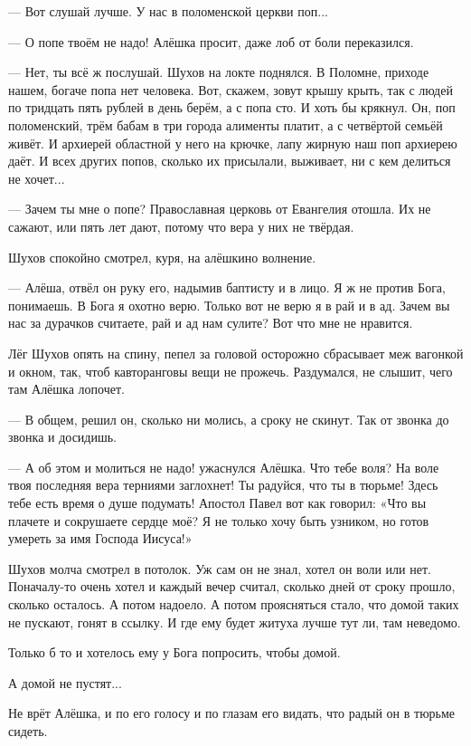 --- Вот слушай лучше. У нас в поломенской церкви поп...

--- О попе твоём \dash не надо! \dash Алёшка просит, даже лоб от боли переказился.

--- Нет, ты всё ж послушай. \dash Шухов на локте поднялся. \Dash В Поломне, приходе нашем, богаче попа
нет человека. Вот, скажем, зовут крышу крыть, так с людей по тридцать пять рублей в день берём,
а с попа \dash сто. И хоть бы крякнул. Он, поп поломенский, трём бабам в три города алименты
платит, а с четвёртой семьёй живёт. И архиерей областной у него на крючке, лапу жирную наш поп
архиерею даёт. И всех других попов, сколько их присылали, выживает, ни с кем делиться не
хочет...

--- Зачем ты мне о попе? Православная церковь от Евангелия отошла. Их не сажают, или пять лет
дают, потому что вера у них не твёрдая.

Шухов спокойно смотрел, куря, на алёшкино волнение.

--- Алёша, \dash отвёл он руку его, надымив баптисту и в лицо. \Dash Я ж не против Бога, понимаешь. В
Бога я охотно верю. Только вот не верю я в рай и в ад. Зачем вы нас за дурачков считаете, рай и
ад нам сулите? Вот что мне не нравится.

Лёг Шухов опять на спину, пепел за головой осторожно сбрасывает меж вагонкой и окном, так,
чтоб кавторанговы вещи не прожечь. Раздумался, не слышит, чего там Алёшка лопочет.

--- В общем, \dash решил он, \Dash сколько ни молись, а сроку не скинут. Так от звонка до звонка и
досидишь.

--- А об этом и молиться не надо! \dash ужаснулся Алёшка. \Dash Что тебе воля? На воле твоя последняя
вера терниями заглохнет! Ты радуйся, что ты в тюрьме! Здесь тебе есть время о душе подумать!
Апостол Павел вот как говорил: «Что вы плачете и сокрушаете сердце моё? Я не только хочу быть
узником, но готов умереть за имя Господа Иисуса!»

Шухов молча смотрел в потолок. Уж сам он не знал, хотел он воли или нет. Поначалу-то очень
хотел и каждый вечер считал, сколько дней от сроку прошло, сколько осталось. А потом надоело.
А потом проясняться стало, что домой таких не пускают, гонят в ссылку. И где ему будет житуха
лучше \dash тут ли, там \dash неведомо.

Только б то и хотелось ему у Бога попросить, чтобы \dash домой.

А домой не пустят...

Не врёт Алёшка, и по его голосу и по глазам его видать, что радый он в тюрьме сидеть.


